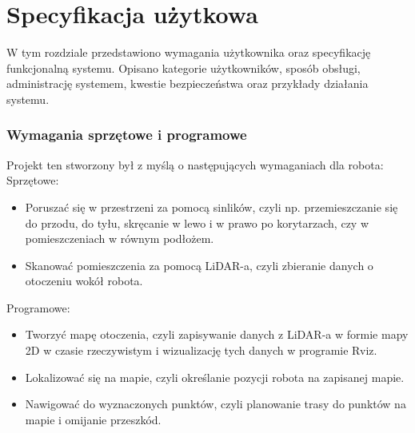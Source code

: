 \documentclass[a4paper,twoside,12pt]{book}
\begin{document}
\chapter{Specyfikacja użytkowa}
\label{ch:04}
W tym rozdziale przedstawiono wymagania użytkownika oraz specyfikację funkcjonalną systemu. Opisano kategorie użytkowników, sposób obsługi, administrację systemem, kwestie bezpieczeństwa oraz przykłady działania systemu.


\subsection{Wymagania sprzętowe i programowe}
Projekt ten stworzony był z myślą o następujących wymaganiach dla robota:
\newline
Sprzętowe:
\begin{itemize}
	\item Poruszać się w przestrzeni za pomocą sinlików, czyli np. przemieszczanie się do przodu, do tyłu, skręcanie w lewo i w prawo po korytarzach, czy w pomieszczeniach w równym podłożem.
	\item Skanować pomieszczenia za pomocą LiDAR-a, czyli zbieranie danych o otoczeniu wokół robota.
	\end{itemize}
Programowe:
\begin{itemize}
	\item Tworzyć mapę otoczenia, czyli zapisywanie danych z LiDAR-a w formie mapy 2D w czasie rzeczywistym i wizualizację tych danych w programie Rviz.
	\item Lokalizować się na mapie, czyli określanie pozycji robota na zapisanej mapie.
	\item Nawigować do wyznaczonych punktów, czyli planowanie trasy do punktów na mapie i omijanie przeszkód.
\end{itemize}
\newpage
\end{document}
